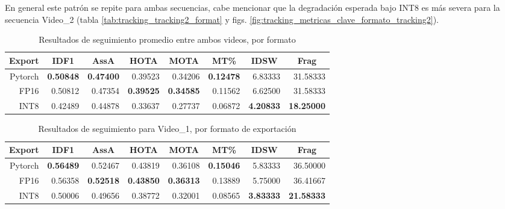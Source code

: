 En general este patrón se repite para ambas secuencias, cabe mencionar que la degradación esperada bajo INT8 es más severa para la secuencia Video\_2 (tabla \ref{tab:tracking_tracking2_format} y figs. \ref{fig:tracking_metricas_clave_formato_tracking2}).

\begin{table}[htbp]
\centering
\caption[Resultados de seguimiento promedio entre ambos videos, por formato.]{Resultados de seguimiento promedio entre ambos videos, por formato}
\label{tab:tracking_average_format}
\begin{tabular}{|r|r|r|r|r|r|r|r|}
\hline
\multicolumn{1}{|c|}{\textbf{Export}} & \multicolumn{1}{c|}{\textbf{IDF1}} & \multicolumn{1}{c|}{\textbf{AssA}} & \multicolumn{1}{c|}{\textbf{HOTA}} & \multicolumn{1}{c|}{\textbf{MOTA}} & \multicolumn{1}{c|}{\textbf{MT\%}} & \multicolumn{1}{c|}{\textbf{IDSW}} & \multicolumn{1}{c|}{\textbf{Frag}} \\ \hline
Pytorch & \textbf{0.50848} & \textbf{0.47400} & 0.39523 & 0.34206 & \textbf{0.12478} & 6.83333 & 31.58333 \\ \hline
FP16 & 0.50812 & 0.47354 & \textbf{0.39525} & \textbf{0.34585} & 0.11562 & 6.62500 & 31.58333 \\ \hline
INT8 & 0.42489 & 0.44878 & 0.33637 & 0.27737 & 0.06872 & \textbf{4.20833} & \textbf{18.25000} \\ \hline
\end{tabular}
\end{table}

\begin{table}[htbp]
\centering
\caption[Resultados de seguimiento para Video\_1, por formato de exportación.]{Resultados de seguimiento para Video\_1, por formato de exportación}
\label{tab:tracking_tracking1_format}
\begin{tabular}{|r|r|r|r|r|r|r|r|}
\hline
\multicolumn{1}{|c|}{\textbf{Export}} & \multicolumn{1}{c|}{\textbf{IDF1}} & \multicolumn{1}{c|}{\textbf{AssA}} & \multicolumn{1}{c|}{\textbf{HOTA}} & \multicolumn{1}{c|}{\textbf{MOTA}} & \multicolumn{1}{c|}{\textbf{MT\%}} & \multicolumn{1}{c|}{\textbf{IDSW}} & \multicolumn{1}{c|}{\textbf{Frag}} \\ \hline
Pytorch & \textbf{0.56489} & 0.52467 & 0.43819 & 0.36108 & \textbf{0.15046} & 5.83333 & 36.50000 \\ \hline
FP16 & 0.56358 & \textbf{0.52518} & \textbf{0.43850} & \textbf{0.36313} & 0.13889 & 5.75000 & 36.41667 \\ \hline
INT8 & 0.50006 & 0.49656 & 0.38772 & 0.32001 & 0.08565 & \textbf{3.83333} & \textbf{21.58333} \\ \hline
\end{tabular}
\end{table}

